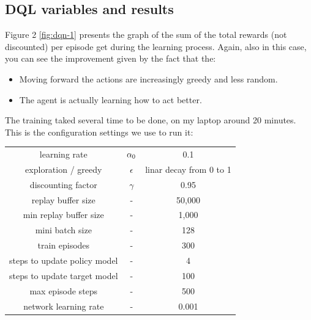 \documentclass{article}
\begin{document}
\subsection{DQL variables and results}

Figure 2 \ref{fig:dqn-1} presents the graph of the sum of the total rewards (not discounted) per episode get during the learning process.
Again, also in this case, you can see the improvement given by the fact that the:

\begin{itemize}
  \item Moving forward the actions are increasingly greedy and less random.
  \item The agent is actually learning how to act better.
\end{itemize}

The training taked several time to be done, on my laptop around 20 minutes.
This is the configuration settings we use to run it:

\begin{tabular}{ c c c }
  learning rate & $\alpha\textsubscript{0}$ & 0.1 \\
  exploration / greedy & $\epsilon$ & linar decay from 0 to 1 \\
  discounting factor & $\gamma$ & 0.95 \\  
  replay buffer size & - & 50,000 \\
  min replay buffer size & - & 1,000 \\
  mini batch size & - & 128 \\
  train episodes & - & 300 \\
  steps to update policy model & - & 4 \\
  steps to update target model & - & 100  \\
  max episode steps & - & 500 \\
  network learning rate & - & 0.001
\end{tabular}
\end{document}
